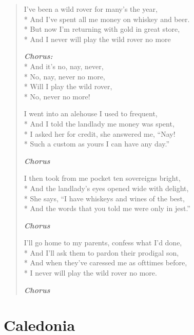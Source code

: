 \documentclass[9pt,twoside]{extarticle}
\newenvironment{xverse}{
	\begin{verse}
	\fontsize{8.5}{10.5}\selectfont
	}
	{
	\end{verse}
	\penalty 0
}
\newcommand{\chorusdef}{\textbf{\emph{Chorus:}}\\*}
\newcommand{\chorusmark}[1][1]{%
\vspace{-0.5\stanzaskip}%
\textbf{\emph{Chorus \ifthenelse{\equal{#1}{1}}{}{$\times$ #1}}}%
\vspace{-0.5\stanzaskip}%
}
\begin{document}
\begin{xverse}
I’ve been a wild rover for many’s the year, \\*
And I’ve spent all me money on whiskey and beer. \\*
But now I’m returning with gold in great store, \\*
And I never will play the wild rover no more

\chorusdef
And it’s no, nay, never, \\*
No, nay, never no more, \\*
Will I play the wild rover, \\*
No, never no more!

I went into an alehouse I used to frequent, \\*
And I told the landlady me money was spent, \\*
I asked her for credit, she answered me, “Nay! \\*
Such a custom as yours I can have any day.”

\chorusmark

I then took from me pocket ten sovereigns bright, \\*
And the landlady’s eyes opened wide with delight, \\*
She says, “I have whiskeys and wines of the best, \\*
And the words that you told me were only in jest.”

\chorusmark

I’ll go home to my parents, confess what I’d done, \\*
And I’ll ask them to pardon their prodigal son, \\*
And when they’ve caressed me as ofttimes before, \\*
I never will play the wild rover no more.

\chorusmark[2]
\end{xverse}

\section{Caledonia}
\end{document}
